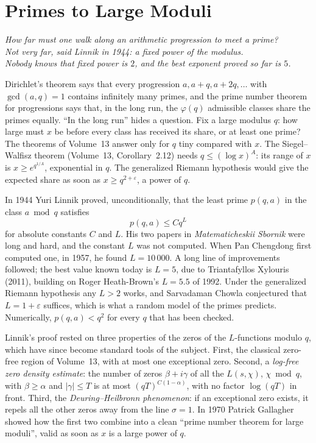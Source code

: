 \chapter{Primes to Large Moduli}\label{ch:largemoduli}
\begin{center}\itshape
How far must one walk along an arithmetic progression to meet a prime?\\
Not very far, said Linnik in 1944: a fixed power of the modulus.\\
Nobody knows that fixed power is $2$, and the best exponent proved so far is $5$.
\end{center}

Dirichlet's theorem says that every progression $a,a+q,a+2q,\dots$ with $\gcd(a,q)=1$ contains infinitely many primes, and the prime number theorem for progressions says that, in the long run, the $\varphi(q)$ admissible classes share the primes equally. ``In the long run'' hides a question. Fix a large modulus $q$: how large must $x$ be before every class has received its share, or at least one prime? The theorems of Volume~13 answer only for $q$ tiny compared with $x$. The Siegel--Walfisz theorem (Volume~13, Corollary~2.12) needs $q\le(\log x)^A$: its range of $x$ is $x\ge e^{q^{1/A}}$, exponential in $q$. The generalized Riemann hypothesis would give the expected share as soon as $x\ge q^{2+\varepsilon}$, a power of $q$.

In 1944 Yuri Linnik proved, unconditionally, that the least prime $p(q,a)$ in the class $a\bmod q$ satisfies
\[
p(q,a)\le Cq^L
\]
for absolute constants $C$ and $L$. His two papers in \emph{Matematicheskii Sbornik} were long and hard, and the constant $L$ was not computed. When Pan Chengdong first computed one, in 1957, he found $L=10\,000$. A long line of improvements followed; the best value known today is $L=5$, due to Triantafyllos Xylouris (2011), building on Roger Heath-Brown's $L=5.5$ of 1992. Under the generalized Riemann hypothesis any $L>2$ works, and Sarvadaman Chowla conjectured that $L=1+\varepsilon$ suffices, which is what a random model of the primes predicts. Numerically, $p(q,a)<q^2$ for every $q$ that has been checked.

Linnik's proof rested on three properties of the zeros of the $L$-functions modulo $q$, which have since become standard tools of the subject. First, the classical zero-free region of Volume~13, with at most one exceptional zero. Second, a \emph{log-free zero density estimate}: the number of zeros $\beta+i\gamma$ of all the $L(s,\chi)$, $\chi\bmod q$, with $\beta\ge\alpha$ and $|\gamma|\le T$ is at most $(qT)^{C(1-\alpha)}$, with no factor $\log(qT)$ in front. Third, the \emph{Deuring--Heilbronn phenomenon}: if an exceptional zero exists, it repels all the other zeros away from the line $\sigma=1$. In 1970 Patrick Gallagher showed how the first two combine into a clean ``prime number theorem for large moduli'', valid as soon as $x$ is a large power of $q$.

